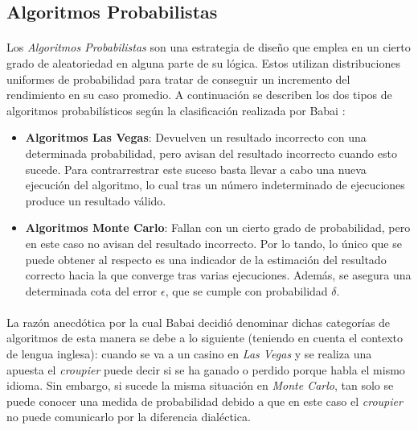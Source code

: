 \documentclass{subfiles}
\begin{document}
      \subsection{Algoritmos Probabilistas}

        \paragraph{}
        Los \emph{Algoritmos Probabilistas} son una estrategia de diseño que emplea en un cierto grado de aleatoriedad en alguna parte de su lógica. Estos utilizan distribuciones uniformes de probabilidad para tratar de conseguir un incremento del rendimiento en su caso promedio. A continuación se describen los dos tipos de algoritmos probabilísticos según la clasificación realizada por Babai \cite{Babai79monte-carloalgorithms}:

        \begin{itemize}

          \item \textbf{Algoritmos Las Vegas}: Devuelven un resultado incorrecto con una determinada probabilidad, pero avisan del resultado incorrecto cuando esto sucede. Para contrarrestrar este suceso basta llevar a cabo una nueva ejecución del algoritmo, lo cual tras un número indeterminado de ejecuciones produce un resultado válido.

          \item \textbf{Algoritmos Monte Carlo}: Fallan con un cierto grado de probabilidad, pero en este caso no avisan del resultado incorrecto. Por lo tando, lo único que se puede obtener al respecto es una indicador de la estimación del resultado correcto hacia la que converge tras varias ejecuciones. Además, se asegura una determinada cota del error $\epsilon$, que se cumple con probabilidad $\delta$.

        \end{itemize}

        \paragraph{}
        La razón anecdótica por la cual Babai \cite{Babai79monte-carloalgorithms} decidió denominar dichas categorías de algoritmos de esta manera se debe a lo siguiente (teniendo en cuenta el contexto de lengua inglesa): cuando se va a un casino en \emph{Las Vegas} y se realiza una apuesta el \emph{croupier} puede decir si se ha ganado o perdido porque habla el mismo idioma. Sin embargo, si sucede la misma situación en \emph{Monte Carlo}, tan solo se puede conocer una medida de probabilidad debido a que en este caso el \emph{croupier} no puede comunicarlo por la diferencia dialéctica.
\end{document}
